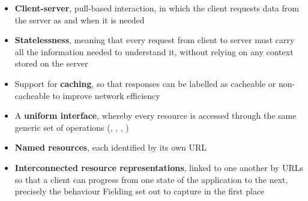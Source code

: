 \begin{itemize}
    \item \textbf{Client-server}, pull-based interaction, in which the client requests data from the server as and when it is needed
    \item \textbf{Statelessness}, meaning that every request from client to server must carry all the information needed to understand it, without relying on any context stored on the server
    \item Support for \textbf{caching}, so that responses can be labelled as cacheable or non-cacheable to improve network efficiency
    \item A \textbf{uniform interface}, whereby every resource is accessed through the same generic set of operations (, , , )
    \item \textbf{Named resources}, each identified by its own URL
    \item \textbf{Interconnected resource representations}, linked to one another by URLs so that a client can progress from one state of the application to the next, precisely the behaviour Fielding set out to capture in the first place
\end{itemize}